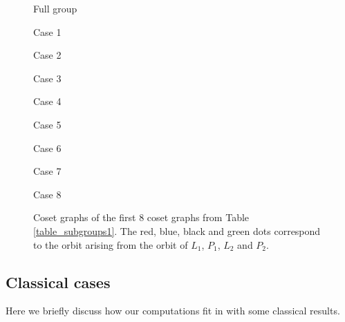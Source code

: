 \documentclass[a4paper,11pt]{article}
\begin{document}
\begin{figure}
\centering
\begin{minipage}[b]{4.1cm}
\centering
{}
Full group
\end{minipage}
\begin{minipage}[b]{4.1cm}
\centering
{}
Case 1
\end{minipage}
\begin{minipage}[b]{4.1cm}
\centering
{}
Case 2
\end{minipage}
\begin{minipage}[b]{4.1cm}
\centering
{}
Case 3
\end{minipage}
\begin{minipage}[b]{4.1cm}
\centering
{}
Case 4
\end{minipage}
\begin{minipage}[b]{4.1cm}
\centering
{}
Case 5
\end{minipage}
\begin{minipage}[b]{4.1cm}
\centering
{}
Case 6
\end{minipage}
\begin{minipage}[b]{4.1cm}
\centering
{}
Case 7
\end{minipage}
\begin{minipage}[b]{4.1cm}
\centering
{}
Case 8
\end{minipage}

\caption{Coset graphs of the first $8$ coset graphs from Table \ref{table_subgroups1}.
The red, blue, black and green dots correspond to the orbit arising from the orbit of $L_1$, $P_1$, $L_2$ and $P_2$.}
\label{FirstEightGraphs}
\end{figure}

\subsection{Classical cases}\label{subsec:classical}
Here we briefly discuss how our computations fit in with some classical results.
\end{document}

